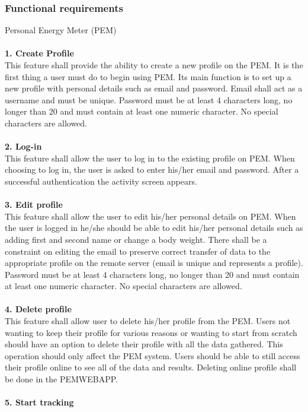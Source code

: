 \documentclass[12pt, a4paper]{report}   %
\begin{document}
\begin{enumerate}
\subsubsection{Functional requirements}
Personal Energy Meter (PEM)\\ \\
\textbf{1. Create Profile}\\
This feature shall provide the ability to create a new profile on the PEM. It is the first thing a user must do to begin using PEM. Its main function is to set up a new profile with personal details such as email and password. Email shall act as a username and must be unique. Password must be at least 4 characters long, no longer than 20 and must contain at least one numeric character. No special characters are allowed.\\ \\
\textbf{2. Log-in}\\
This feature shall allow the user to log in to the existing profile on PEM. When choosing to log in, the user is asked to enter his/her email and password. After a successful authentication the activity screen appears.\\ \\
\textbf{3. Edit profile}\\
This feature shall allow the user to edit his/her personal details on PEM. When the user is logged in he/she should be able to edit his/her personal details such as adding first and second name or change a body weight. There shall be a constraint on editing the email to preserve correct transfer of data to the appropriate profile on the remote server (email is unique and represents a profile). Password must be at least 4 characters long, no longer than 20 and must contain at least one numeric character. No special characters are allowed.\\ \\
\textbf{4. Delete profile}\\
This feature shall allow user to delete his/her profile from the PEM. Users not wanting to keep their profile for various reasons or wanting to start from scratch should have an option to delete their profile with all the data gathered. This operation should only affect the PEM system. Users should be able to still access their profile online to see all of the data and results. Deleting online profile shall be done in the PEMWEBAPP.\\ \\
\textbf{5. Start tracking}\\

\end{enumerate}
\end{document}

